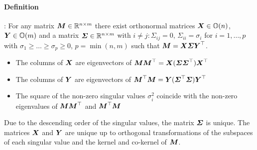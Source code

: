 \paragraph{Definition}
\cite[Theo.\ 2.5.2]{Golub:MatrixComputations}:
For any matrix $\boldsymbol{M} \in \mathbb{R}^{n\times m}$ there exist orthonormal matrices $\boldsymbol{X} \in \mathbb{O}(n)$, $\boldsymbol{Y} \in \mathbb{O}(m)$ and a matrix $\boldsymbol{\varSigma} \in \mathbb{R}^{n\times m}$ with $i\neq j : \varSigma_{ij} = 0$, $\varSigma_{ii} = \sigma_i$ for $i = 1, \ldots, p$ with $\sigma_1 \geq \ldots \geq \sigma_p \geq 0$, $p=\min(n,m)$ such that $\boldsymbol{M} = \boldsymbol{X} \boldsymbol{\varSigma} \boldsymbol{Y}^\top$.
\begin{itemize}
 \item The columns of $\boldsymbol{X}$ are eigenvectors of $\boldsymbol{M} \boldsymbol{M}^\top = \boldsymbol{X} (\boldsymbol{\varSigma} \boldsymbol{\varSigma}^\top) \boldsymbol{X}^\top$
 \item The columns of $\boldsymbol{Y}$ are eigenvectors of $\boldsymbol{M}^\top \boldsymbol{M} = \boldsymbol{Y} (\boldsymbol{\varSigma}^\top \boldsymbol{\varSigma}) \boldsymbol{Y}^\top$
 \item The square of the non-zero singular values $\sigma_i^2$ coincide with the non-zero eigenvalues of $\boldsymbol{M} \boldsymbol{M}^\top$ and $\boldsymbol{M}^\top \boldsymbol{M}$
\end{itemize}
Due to the descending order of the singular values, the matrix $\boldsymbol{\varSigma}$ is unique.
The matrices $\boldsymbol{X}$ and $\boldsymbol{Y}$ are unique up to orthogonal transformations of the subspaces of each singular value and the kernel and co-kernel of $\boldsymbol{M}$.


